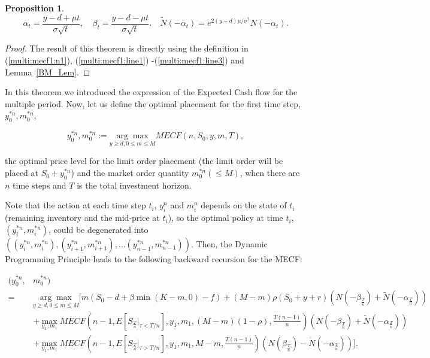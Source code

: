 \documentclass[11pt]{article}
\theoremstyle{plain}
\numberwithin{equation}{section}
\newtheorem{prop}[thm]{Proposition}
\begin{document}
\begin{prop}
\[
\alpha_t= \frac{y-d+\mu t}{\sigma \sqrt{t}},
\quad
\beta_t = \frac{y-d-\mu t}{\sigma\sqrt{t}}.
\quad \tilde{N}(-\alpha_t)= e^{2(y-d)\mu/\sigma^2}N(-\alpha_t).
\]
\end{prop}

\begin{proof}
The result of this theorem is directly using the definition in  (\ref{multi:mecf1:n1}),  (\ref{multi:mecf1:line1}) -(\ref{multi:mecf1:line3}) and Lemma~\ref{BM_Lem}. 
\end{proof}

In this theorem we introduced the expression of the Expected Cash flow for the multiple period. Now, let us define the optimal placement for the first time step, $y_0^{*n}, m_0^{*n}$,


\begin{equation}\label{opt:ym:multi}
y_0^{*n}, m_0^{*n} := \underset{y\geq d,0\leq m\leq M}{\arg\max} MECF(n,S_0,y,m,T),
\end{equation}




 the optimal price level for the limit order placement (the limit order will be placed at $S_0+y_0^{*n}$) and the market order quantity $m_0^{*n}(\leq M)$, when there are $n$ time steps and $T$ is the total investment horizon.
 
 
 {
 Note that the action at each time step $t_i$, $y_i^{n}$ and $m_i^{n}$ depends on the state of $t_i$ (remaining inventory and the mid-price at $t_i$), so the optimal policy at time $t_i$, $(y_i^{*n}, m_i^{*n})$, could be degenerated into $\left((y_i^{*n}, m_i^{*n}), (y_{i+1}^{*n}, m_{i+1}^{*n}), \dots (y_{n-1}^{*n}, m_{n-1}^{*n})\right)$. Then, the Dynamic Programming Principle leads to the following backward recursion for the MECF:
 }
%

\begin{align*}
(y_0^{*n},& m_0^{*n})\\
=&\underset{y\geq d,0\leq m\leq M}{\arg\max} \bigg[ m(S_0-d+\beta \min (K-m,0)-f)+ (M-m)\rho  (S_0+y+r) \left(N\left(-\beta_{\frac{T}{n}} \right)+\tilde{N}\left(-\alpha_{\frac{T}{n}}\right) \right)\\
\quad &+\max_{y_1,m_1} MECF(n-1,E[{S_{\frac{T}{n}}|_{\tau<T/n}}],y_1,m_1,(M-m)(1-\rho)
, \frac{T(n-1)}{n} ) \left(N\left(-\beta_{\frac{T}{n}} \right)+\tilde{N}\left(-\alpha_{\frac{T}{n}}\right) \right)\\
&+ \max_{y_1, m_1}MECF(n-1,E[{S_{\frac{T}{n}}|_{\tau>T/n}}],y_1,m_1,M-m, \frac{T(n-1)}{n} ) \left(N\left(\beta_{\frac{T}{n}} \right)-\tilde{N}\left(-\alpha_{\frac{T}{n}}\right) \right)\bigg].
\end{align*}
\end{document}
